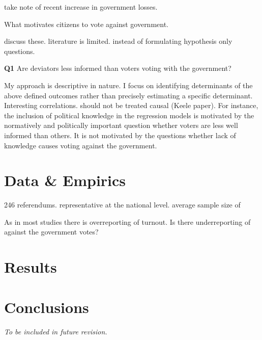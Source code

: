 \documentclass[11pt,a4paper]{article}
\begin{document}
take note of recent increase in government losses.

What motivates citizens to vote against government.

discuss these. literature is limited. instead of formulating hypothesis only questions.

\textbf{Q1} Are deviators less informed than voters voting with the government?

My approach is descriptive in nature. I focus on identifying determinants of the above defined outcomes rather than precisely estimating a specific determinant. Interesting correlations. should not be treated causal (Keele paper). For instance, the inclusion of political knowledge in the regression models is motivated by the normatively and politically important question whether voters are less well informed than others. It is not motivated by the questions whether lack of knowledge causes voting against the government.

\section{Data \& Empirics}

246 referendums. representative at the national level. average sample size of 

As in most studies there is overreporting of turnout. Is there underreporting of against the government votes?

\section{Results}

\section{Conclusions}

\textit{To be included in future revision.}
\end{document}
